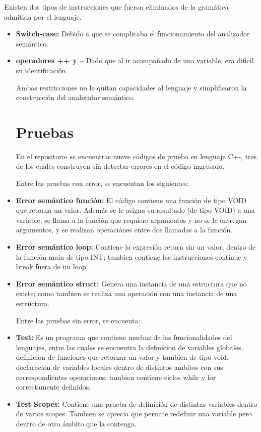 \documentclass[12pt]{article}
\begin{document}
\begin{itemize}
Existen dos tipos de instrucciones que fueron eliminados de la gramática admitida por el lenguaje.

\begin{itemize}
    \item \textbf{Switch-case: } Debido a que se complicaba el funcionamiento del analizador semántico.
    \item \textbf{operadores ++ y --} Dado que al ir acompañado de una variable, era dificil su identificación.

Ambas restricciones no le quitan capacidades al lenguaje y simplificaron la construcción del analizador semántico.


\section*{Pruebas}
En el repositorio se encuentras nueve c\'odigos de prueba en lenguaje C+-, tres de los cuales construyen sin detectar errores en el código ingresado.

Entre las pruebas con error, se encuentan los siguientes:
\item \textbf{Error semántico función: } El código contiene una función de tipo VOID que retorna un valor. Además se le asigna su resultado (de tipo VOID) a una variable, se llama a la función que requiere argumentos y no se le entregan argumentos, y se realizan operaciónes entre dos llamadas a la función.

\item \textbf{Error semántico loop: } Contiene la expresión return sin un valor, dentro de la función main de tipo INT; tambien contiene las instrucciones continue y break fuera de un loop.  

\item \textbf{Error semántico struct: } Genera una instancia de una estructura que no existe; como tambien se realiza una operación con una instancia de una estructura.


Entre las pruebas sin error, se encuenta:
\item \textbf{Test: } Es un programa que contiene muchas de las funcionalidades del lenguajes, entre las cuales se encuentra la definicion de variables globales, definicion de funciones que retornar un valor y tambien de tipo void, declaración de variables locales dentro de distintos ambitos con sus correspondientes operaciones; tambien contiene ciclos while y for correctamente definidos.

\item \textbf{Test Scopes: } Contiene una prueba de definición de distintas variables dentro de varios scopes. Tambien se aprecia que permite redefinir una variable pero dentro de otro ámbito que la contenga. 


\end{itemize}
\end{itemize}
\end{document}
